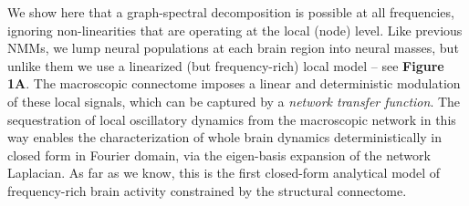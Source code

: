 We show here that a graph-spectral decomposition is possible at all
frequencies, ignoring non-linearities that are operating at the local
(node) level. Like previous NMMs, we lump neural populations at each
brain region into neural masses, but unlike them we use a linearized
(but frequency-rich) local model -- see \textbf{Figure 1A}. The
macroscopic connectome imposes a linear and deterministic modulation of
these local signals, which can be captured by a \emph{network transfer
function}. The sequestration of local oscillatory dynamics from the
macroscopic network in this way enables the characterization of whole
brain dynamics deterministically in closed form in Fourier domain, via
the eigen-basis expansion of the network Laplacian. As far as we know,
this is the first closed-form analytical model of frequency-rich brain
activity constrained by the structural connectome.

